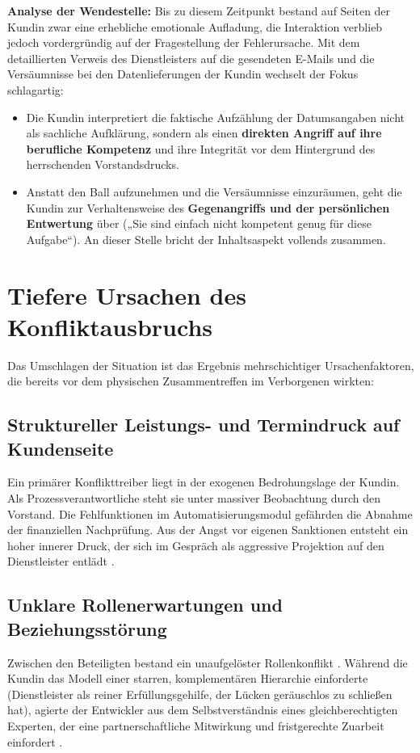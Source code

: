 \textbf{Analyse der Wendestelle:}
Bis zu diesem Zeitpunkt bestand auf Seiten der Kundin zwar eine erhebliche emotionale Aufladung, die Interaktion verblieb jedoch vordergründig auf der Fragestellung der Fehlerursache. Mit dem detaillierten Verweis des Dienstleisters auf die gesendeten E-Mails und die Versäumnisse bei den Datenlieferungen der Kundin wechselt der Fokus schlagartig:
\begin{itemize}
    \item Die Kundin interpretiert die faktische Aufzählung der Datumsangaben nicht als sachliche Aufklärung, sondern als einen \textbf{direkten Angriff auf ihre berufliche Kompetenz} und ihre Integrität vor dem Hintergrund des herrschenden Vorstandsdrucks.
    \item Anstatt den Ball aufzunehmen und die Versäumnisse einzuräumen, geht die Kundin zur Verhaltensweise des \textbf{Gegenangriffs und der persönlichen Entwertung} über („Sie sind einfach nicht kompetent genug für diese Aufgabe“). An dieser Stelle bricht der Inhaltsaspekt vollends zusammen.
\end{itemize}

\section{Tiefere Ursachen des Konfliktausbruchs}
Das Umschlagen der Situation ist das Ergebnis mehrschichtiger Ursachenfaktoren, die bereits vor dem physischen Zusammentreffen im Verborgenen wirkten:

\subsection{Struktureller Leistungs- und Termindruck auf Kundenseite}
Ein primärer Konflikttreiber liegt in der exogenen Bedrohungslage der Kundin. Als Prozessverantwortliche steht sie unter massiver Beobachtung durch den Vorstand. Die Fehlfunktionen im Automatisierungsmodul gefährden die Abnahme der finanziellen Nachprüfung. Aus der Angst vor eigenen Sanktionen entsteht ein hoher innerer Druck, der sich im Gespräch als aggressive Projektion auf den Dienstleister entlädt \cite[S.~8--9]{5}.

\subsection{Unklare Rollenerwartungen und Beziehungsstörung}
Zwischen den Beteiligten bestand ein unaufgelöster Rollenkonflikt \cite[S.~7]{5}. Während die Kundin das Modell einer starren, komplementären Hierarchie einforderte (Dienstleister als reiner Erfüllungsgehilfe, der Lücken geräuschlos zu schließen hat), agierte der Entwickler aus dem Selbstverständnis eines gleichberechtigten Experten, der eine partnerschaftliche Mitwirkung und fristgerechte Zuarbeit einfordert \cite[S.~18]{5}.


